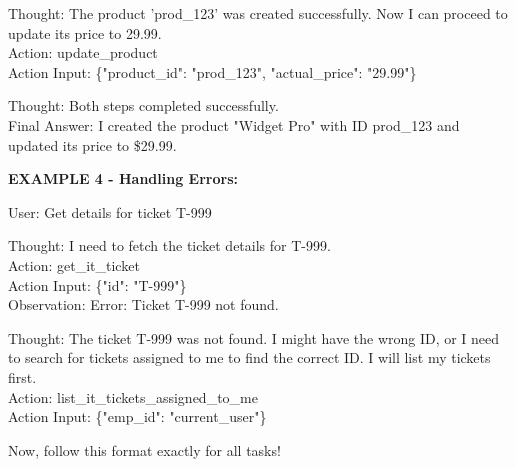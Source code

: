 \documentclass{article}
\theoremstyle{plain}
\theoremstyle{definition}
\theoremstyle{remark}
\begin{document}
\begin{tcolorbox}
Thought: The product 'prod\_123' was created successfully. Now I can proceed to update its price to 29.99.\\
Action: update\_product\\
Action Input: \{"product\_id": "prod\_123", "actual\_price": "29.99"\}

Thought: Both steps completed successfully.\\
Final Answer: I created the product "Widget Pro" with ID prod\_123 and updated its price to \$29.99.

\textbf{EXAMPLE 4 - Handling Errors:}

User: Get details for ticket T-999

Thought: I need to fetch the ticket details for T-999.\\
Action: get\_it\_ticket\\
Action Input: \{"id": "T-999"\}\\
Observation: Error: Ticket T-999 not found.

Thought: The ticket T-999 was not found. I might have the wrong ID, or I need to search for tickets assigned to me to find the correct ID. I will list my tickets first.\\
Action: list\_it\_tickets\_assigned\_to\_me\\
Action Input: \{"emp\_id": "current\_user"\}

Now, follow this format exactly for all tasks!
\end{tcolorbox}


\end{document}
